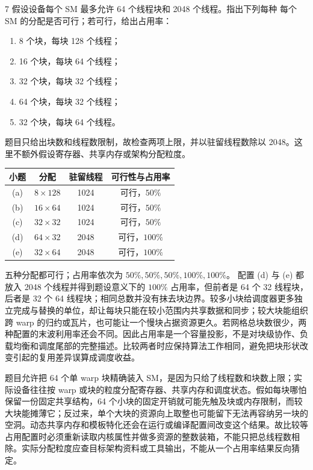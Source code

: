 \begin{solutionexercise}{7}
\problemheading 假设设备每个 SM 最多允许 64 个线程块和 2048 个线程。指出下列每种
每个 SM 的分配是否可行；若可行，给出占用率：
\begin{enumerate}[label=\alph*.,leftmargin=2.2em]
  \item 8 个块，每块 128 个线程；
  \item 16 个块，每块 64 个线程；
  \item 32 个块，每块 32 个线程；
  \item 64 个块，每块 32 个线程；
  \item 32 个块，每块 64 个线程。
\end{enumerate}

\approachheading 题目只给出块数和线程数限制，故检查两项上限，并以驻留线程数除以
2048。这里不额外假设寄存器、共享内存或架构分配粒度。

\answerheading
\begin{center}
\begin{tabular}{c@{\quad}c@{\quad}c@{\quad}c}
\toprule
小题 & 分配 & 驻留线程 & 可行性与占用率\\
\midrule
(a) & $8\times128$  & 1024 & 可行，$50\%$\\
(b) & $16\times64$  & 1024 & 可行，$50\%$\\
(c) & $32\times32$  & 1024 & 可行，$50\%$\\
(d) & $64\times32$  & 2048 & 可行，$100\%$\\
(e) & $32\times64$  & 2048 & 可行，$100\%$\\
\bottomrule
\end{tabular}
\end{center}

\conclusionheading 五种分配都可行；占用率依次为 $50\%,50\%,50\%,100\%,100\%$。
\discussionheading
{}
配置 (d) 与 (e) 都放入 2048 个线程并得到题设意义下的 $100\%$ 占用率，但前者是 64 个 32 线程块，后者是 32 个 64 线程块；相同总数并没有抹去块边界。较多小块给调度器更多独立完成与替换的单位，却让每块只能在较小范围内共享数据和同步；较大块能组织跨 warp 的归约或瓦片，也可能让一个慢块占据资源更久。若网格总块数很少，两种配置的末波利用率还会不同。因此占用率是一个容量投影，不是对块级协作、负载均衡和调度尾部的完整描述。比较两者时应保持算法工作相同，避免把块形状改变引起的复用差异误算成调度收益。

题目允许把 64 个单 warp 块精确装入 SM，是因为只给了线程数和块数上限；实际设备往往按 warp 或块的粒度分配寄存器、共享内存和调度状态。假如每块哪怕保留一份固定共享结构，64 个小块的固定开销就可能先触及块或内存限制，而较大块能摊薄它；反过来，单个大块的资源向上取整也可能留下无法再容纳另一块的空洞。动态共享内存和模板特化还会在运行或编译配置间改变这个结果。故比较等占用配置时必须重新读取内核属性并做多资源的整数装箱，不能只把总线程数相除。实际分配粒度应查目标架构资料或工具输出，不能从一个占用率结果反向猜定。


\end{solutionexercise}
